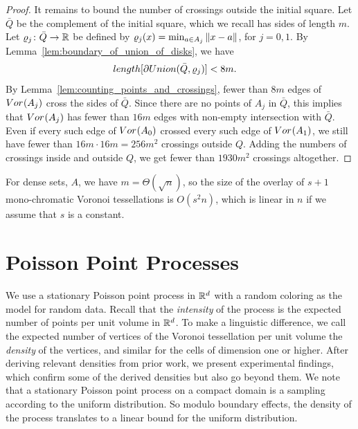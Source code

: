 \documentclass[a4paper]{article}
\newcommand {\mm}[1]   {\ifmmode{#1}\else{\mbox{\(#1\)}}\fi}
\newcommand{\Rspace}        {\mm{{\mathbb R}}}
\newcommand{\Voronoi}[2]    {\mm{{\rm Vor}_{#1}{({#2})}}}
\newcommand{\length}[1]     {\mm{\rm length}{[{#1}]}}
\newcommand{\Union}[2]      {\mm{\rm Union}{({#1},{#2})}}
\newcommand{\Edist}[2]      {\mm{\|{#1}-{#2}\|}}
\theoremstyle{definition}
\numberwithin{theorem}{section}
\numberwithin{equation}{section}
\begin{document}
\begin{proof}
  \medskip
  It remains to bound the number of crossings outside the initial square.
  Let $\bar{Q}$ be the complement of the initial square, which we recall has sides of length $m$.
  Let $\varrho_j \colon \bar{Q} \to \Rspace$ be defined by $\varrho_j (x) = \min_{a \in A_j} \Edist{x}{a}$, for $j = 0, 1$.
  By Lemma~\ref{lem:boundary_of_union_of_disks}, we have
  \begin{align}
    \length{\partial \Union{\bar{Q}}{\varrho_j}}  &<  8m .
  \end{align}
  By Lemma~\ref{lem:counting_points_and_crossings}, fewer than $8m$ edges of $\Voronoi{}{A_j}$ cross the sides of $\bar{Q}$.
  Since there are no points of $A_j$ in $\bar{Q}$,
  this implies that $\Voronoi{}{A_j}$ has fewer than $16 m$ edges with non-empty intersection with $\bar{Q}$.
  Even if every such edge of $\Voronoi{}{A_0}$ crossed every such edge of $\Voronoi{}{A_1}$, we still have fewer than $16 m \cdot 16 m = 256 m^2$ crossings outside $Q$.
  Adding the numbers of crossings inside and outside $Q$, we get fewer than $1930 m^2$ crossings altogether.
\end{proof}

For dense sets, $A$, we have $m = \Theta (\sqrt{n})$, so the size of the overlay of $s+1$ mono-chromatic Voronoi tessellations is $O(s^2 n)$, which is linear in $n$ if we assume that $s$ is a constant.



\section{Poisson Point Processes}
\label{sec:5}

We use a stationary Poisson point process in $\Rspace^d$ with a random coloring as the model for random data.
Recall that the \emph{intensity} of the process is the expected number of points per unit volume in $\Rspace^d$.
To make a linguistic difference, we call the expected number of vertices of the Voronoi tessellation per unit volume the \emph{density} of the vertices, and similar for the cells of dimension one or higher.
After deriving relevant densities from prior work, we present experimental findings, which confirm some of the derived densities but also go beyond them.
We note that a stationary Poisson point process on a compact domain is a sampling according to the uniform distribution.
So modulo boundary effects, the density of the process translates to a linear bound for the uniform distribution.
\end{document}
